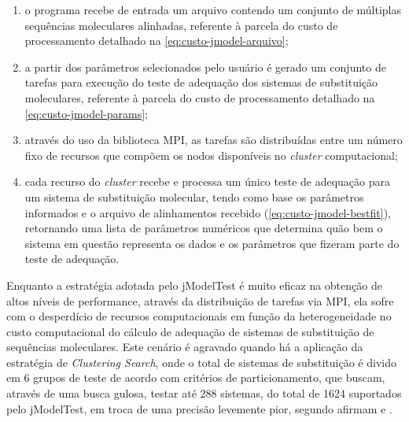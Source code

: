 \documentclass[english,brazilian]{UNISINOSmonografia} %
\begin{document}
\begin{enumerate}[label={\arabic*)}]
	
	\item o programa recebe de entrada um arquivo contendo um conjunto de múltiplas sequências moleculares alinhadas, referente à parcela do custo de processamento detalhado na \autoref{eq:custo-jmodel-arquivo};
	
	\item a partir dos parâmetros selecionados pelo usuário é gerado um conjunto de tarefas para execução do teste de adequação dos sistemas de substituição moleculares, referente à parcela do custo de processamento detalhado na \autoref{eq:custo-jmodel-params};
	
	\item através do uso da biblioteca MPI, as tarefas são distribuídas entre um número fixo de recursos que compõem os nodos disponíveis no \textit{cluster} computacional;
	
	\item cada recurso do \textit{cluster} recebe e processa um único teste de adequação para um sistema de substituição molecular, tendo como base os parâmetros informados e o arquivo de alinhamentos recebido (\autoref{eq:custo-jmodel-bestfit}), retornando uma lista de parâmetros numéricos que determina quão bem o sistema em questão representa os dados e os parâmetros que fizeram parte do teste de adequação.
	
\end{enumerate}



Enquanto a estratégia adotada pelo jModelTest é muito eficaz na obtenção de altos níveis de performance, através da distribuição de tarefas via MPI, ela sofre com o desperdício de recursos computacionais em função da heterogeneidade no custo computacional do cálculo de adequação de sistemas de substituição de sequências moleculares.
Este cenário é agravado quando há a aplicação da estratégia de \textit{Clustering Search}, onde o total de sistemas de substituição é divido em 6 grupos de teste de acordo com critérios de particionamento, que buscam, através de uma busca gulosa, testar até 288 sistemas, do total de 1624 suportados pelo jModelTest, em troca de uma precisão levemente pior, segundo afirmam  e .
\end{document}

